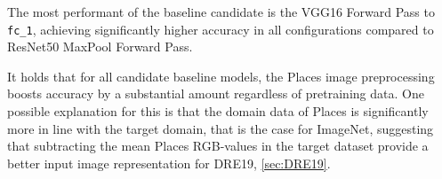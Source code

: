 The most performant of the baseline candidate is the VGG16 Forward Pass to \texttt{fc\_1}, achieving significantly higher accuracy in all configurations compared to ResNet50 MaxPool Forward Pass. 

\begin{table}[H]
    \centering
\end{table}

It holds that for all candidate baseline models, the Places image preprocessing boosts accuracy by a substantial amount regardless of pretraining data.
One possible explanation for this is that the domain data of Places is significantly more in line with the target domain, that is the case for ImageNet, suggesting that subtracting the mean Places RGB-values in the target dataset provide a better input image representation for DRE19, \ref{sec:DRE19}.
